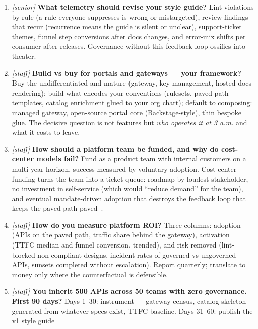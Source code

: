 \begin{enumerate}[label=\textbf{Q\arabic*.}, leftmargin=1.7cm]
        contractual rights you must design around, not through.
  \item \emph{[senior]} \textbf{What telemetry should revise your style
        guide?} Lint violations by rule (a rule everyone suppresses is
        wrong or mistargeted), review findings that recur (recurrence
        means the guide is silent or unclear), support-ticket themes,
        funnel step conversions after docs changes, and error-mix shifts
        per consumer after releases. Governance without this feedback
        loop ossifies into theater.
  \item \emph{[staff]} \textbf{Build vs buy for portals and gateways ---
        your framework?} Buy the undifferentiated and mature (gateway,
        key management, hosted docs rendering); build what encodes your
        conventions (rulesets, paved-path templates, catalog enrichment
        glued to your org chart); default to composing: managed gateway,
        open-source portal core (Backstage-style), thin bespoke glue.
        The decisive question is not features but \emph{who operates it
        at 3 a.m.} and what it costs to leave.
  \item \emph{[staff]} \textbf{How should a platform team be funded, and
        why do cost-center models fail?} Fund as a product team with
        internal customers on a multi-year horizon, success measured by
        voluntary adoption. Cost-center funding turns the team into a
        ticket queue: roadmap by loudest stakeholder, no investment in
        self-service (which would ``reduce demand'' for the team), and
        eventual mandate-driven adoption that destroys the feedback loop
        that keeps the paved path paved~\cite{newman2021microservices}.
  \item \emph{[staff]} \textbf{How do you measure platform ROI?} Three
        columns: adoption (APIs on the paved path, traffic share behind
        the gateway), activation (TTFC median and funnel conversion,
        trended), and risk removed (lint-blocked non-compliant designs,
        incident rates of governed vs ungoverned APIs, sunsets completed
        without escalation). Report quarterly; translate to money only
        where the counterfactual is defensible.
  \item \emph{[staff]} \textbf{You inherit 500 APIs across 50 teams with
        zero governance. First 90 days?} Days 1--30: instrument ---
        gateway census, catalog skeleton generated from whatever specs
        exist, TTFC baseline. Days 31--60: publish the v1 style guide

\end{enumerate}
